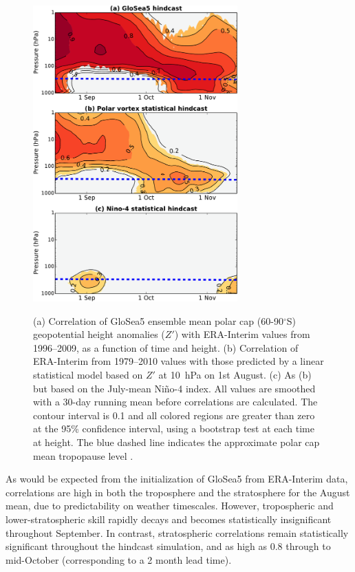 \begin{figure}
  \centering
  \noindent\includegraphics[width=0.7\textwidth,angle=0]{figures/chapter-seasonal/lag_corr_crop_vert.pdf}\\
  \caption[Lag-height correlation of GloSea5 polar cap geopotential height]{(a)
    Correlation of GloSea5 ensemble mean polar cap (60-90$^{\circ}$S)
    geopotential height anomalies ($Z'$) with ERA-Interim values from
    1996--2009, as a function of time and height. (b) Correlation of ERA-Interim
    from 1979--2010 values with those predicted by a linear statistical model
    based on $Z'$ at 10~hPa on 1st August. (c) As (b) but based on the July-mean
    Ni\~no-4 index. All values are smoothed with a 30-day running mean before
    correlations are calculated. The contour interval is 0.1 and all colored
    regions are greater than zero at the 95\% confidence interval, using a
    bootstrap test at each time at height. The blue dashed line indicates the
    approximate polar cap mean tropopause level
    \citep{Wilcox2012}.} \label{fig:gph_lag_corr}
\end{figure}


As would be expected from the initialization of GloSea5 from ERA-Interim data,
correlations are high in both the troposphere and the stratosphere for the
August mean, due to predictability on weather timescales. However, tropospheric
and lower-stratospheric skill rapidly decays and becomes statistically
insignificant throughout September. In contrast, stratospheric correlations
remain statistically significant throughout the hindcast simulation, and as high
as 0.8 through to mid-October (corresponding to a 2 month lead time). 

